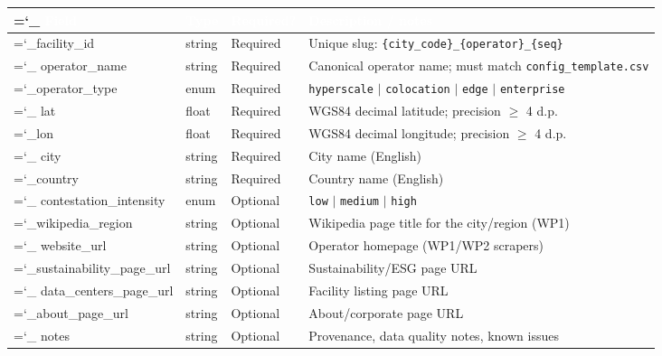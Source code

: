 \begin{fullwidth}
\footnotesize
{}
\setlength{\tabcolsep}{4pt}
\renewcommand{\arraystretch}{1.25}
\begin{tabularx}{\linewidth}{>{\ttfamily\raggedright\hyphenchar\font=`\_}p{4.5cm}>{\raggedright}p{1.0cm}>{\raggedright}p{1.6cm}X}
\toprule
\rowcolor{dcblue}
\textcolor{white}{\textbf{Field}} &
\textcolor{white}{\textbf{Type}} &
\textcolor{white}{\textbf{Required?}} &
\textcolor{white}{\textbf{Description / notes}} \\
\midrule
facility\_id    & string  & Required  & Unique slug: \texttt{\{city\_code\}\_\{operator\}\_\{seq\}} \\
\rowcolor{dcgray}
operator\_name  & string  & Required  & Canonical operator name; must match \texttt{config\_template.csv} \\
operator\_type  & enum    & Required  & \texttt{hyperscale} $|$ \texttt{colocation} $|$ \texttt{edge} $|$ \texttt{enterprise} \\
\rowcolor{dcgray}
lat             & float   & Required  & WGS84 decimal latitude; precision $\geq$ 4 d.p. \\
lon             & float   & Required  & WGS84 decimal longitude; precision $\geq$ 4 d.p. \\
\rowcolor{dcgray}
city            & string  & Required  & City name (English) \\
country         & string  & Required  & Country name (English) \\
\rowcolor{dcgray}
contestation\_intensity & enum & Optional & \texttt{low} $|$ \texttt{medium} $|$ \texttt{high} \\
wikipedia\_region & string & Optional & Wikipedia page title for the city/region (WP1) \\
\rowcolor{dcgray}
website\_url    & string  & Optional  & Operator homepage (WP1/WP2 scrapers) \\
sustainability\_page\_url & string & Optional & Sustainability/ESG page URL \\
\rowcolor{dcgray}
data\_centers\_page\_url & string & Optional & Facility listing page URL \\
about\_page\_url & string & Optional & About/corporate page URL \\
\rowcolor{dcgray}
notes           & string  & Optional  & Provenance, data quality notes, known issues \\
\bottomrule
\end{tabularx}
\end{fullwidth}


